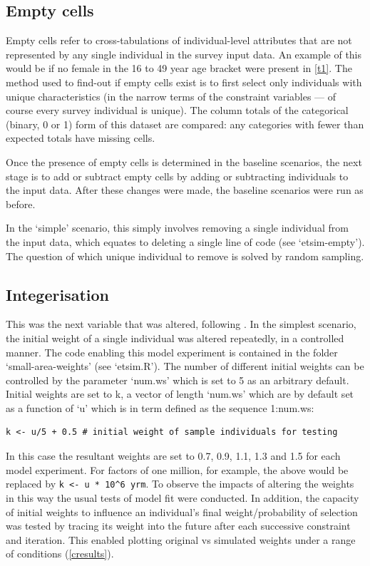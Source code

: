 \documentclass[a4paper,10pt]{article}
\begin{document}
\subsection{Empty cells} 
Empty cells refer to cross-tabulations of individual-level 
attributes that are not represented by any single individual 
in the survey input data. An example of this would be if no female 
in the 16 to 49 year age bracket were present in \cref{t1}. 
The method used to find-out if empty cells exist is to first 
select only individuals with unique characteristics 
(in the narrow terms of the constraint variables --- of course every survey individual is unique). 
The column totals of the categorical (binary, 0 or 1) form of this dataset are compared: 
any categories with fewer than expected totals have missing cells. 

Once the presence of empty cells is determined in the baseline scenarios, the next 
stage is to add or subtract empty cells by adding or subtracting individuals to the 
input data. After these changes were made, the baseline scenarios were run as before.

In the ‘simple’ scenario, this simply involves removing a single individual from the 
input data, which equates to deleting a single line of code (see `etsim-empty'). %
The question of which unique individual to remove is solved by random sampling. 

\subsection{Integerisation}
This was the next variable that was altered, 
following \citep{}. In the simplest scenario, the 
initial weight of a single individual was altered 
repeatedly, in a controlled manner. The code enabling this model experiment 
is contained in the folder `small-area-weights' (see `etsim.R'). 
The number of different initial weights can be controlled by the 
parameter `num.ws' which is set to 5 as an arbitrary default.
Initial weights are set to k, a vector of length `num.ws' which
are by default set as a function of `u' which is in term
defined as the sequence 1:num.ws:

\begin{lstlisting}
k <- u/5 + 0.5 # initial weight of sample individuals for testing 
\end{lstlisting}

In this case the resultant weights are set to
 0.7, 0.9, 1.1, 1.3 and 1.5 for each model experiment. 
For factors of one million, for example, 
the above would be replaced by \lstinline !k <- u * 10^6 yrm!. 
To observe the impacts of altering the weights in this way
the usual tests of model fit were conducted. In addition,
the capacity of initial weights to influence an individual's 
final weight/probability of selection was tested by tracing its
weight into the future after each successive constraint and iteration. 
This enabled plotting original vs simulated weights under a 
range of conditions (\cref{cresults}).
  
\end{document}
